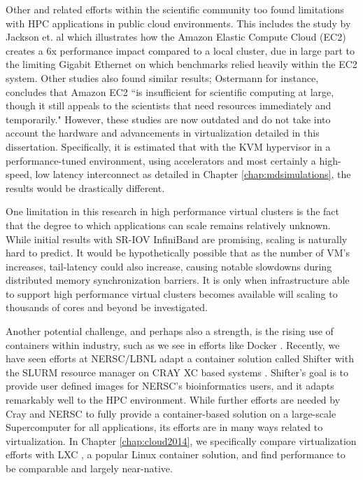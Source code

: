 Other and related efforts within the scientific community too found limitations with HPC applications in public cloud environments. This includes the study by Jackson et. al \cite{jackson2010performance} which illustrates how the Amazon Elastic Compute Cloud (EC2) creates a 6x performance impact compared to a local cluster, due in large part to the limiting Gigabit Ethernet on which benchmarks relied heavily within the EC2 system. Other studies also found similar results; Ostermann \cite{ostermann2009performance} for instance, concludes that Amazon EC2 ``is insufficient for scientific computing at large, though it still appeals to the scientists that need resources immediately and temporarily."  However, these studies are now outdated and do not take into account the hardware and advancements in virtualization detailed in this dissertation. Specifically, it is estimated that with the KVM hypervisor in a performance-tuned environment, using accelerators and most certainly a high-speed, low latency interconnect as detailed in Chapter \ref{chap:mdsimulations}, the results would be drastically different. 


One limitation in this research in high performance virtual clusters is the fact that the degree to which applications can scale remains relatively unknown. While initial results with SR-IOV InfiniBand are promising, scaling is naturally hard to predict. It would be hypothetically possible that as the number of VM's increases, tail-latency could also increase, causing notable slowdowns during distributed memory synchronization barriers. It is only when infrastructure able to support high performance virtual clusters becomes available will scaling to thousands of cores and beyond be investigated.  

Another potential challenge, and perhaps also a strength, is the rising use of containers within industry, such as we see in efforts like Docker \cite{merkel2014docker}. Recently, we have seen efforts at NERSC/LBNL adapt a container solution called Shifter with the SLURM resource manager on CRAY XC based systems \cite{jacobsen2015contain}. Shifter's goal is to provide user defined images for NERSC's bioinformatics users, and it adapts remarkably well to the HPC environment. While further efforts are needed by Cray and NERSC to fully provide a container-based solution on a large-scale Supercomputer for all applications, its efforts are in many ways related to virtualization. In Chapter \ref{chap:cloud2014}, we specifically compare virtualization efforts with LXC \cite{xavier2013performance}, a popular Linux container solution, and find performance to be comparable and largely near-native. 


